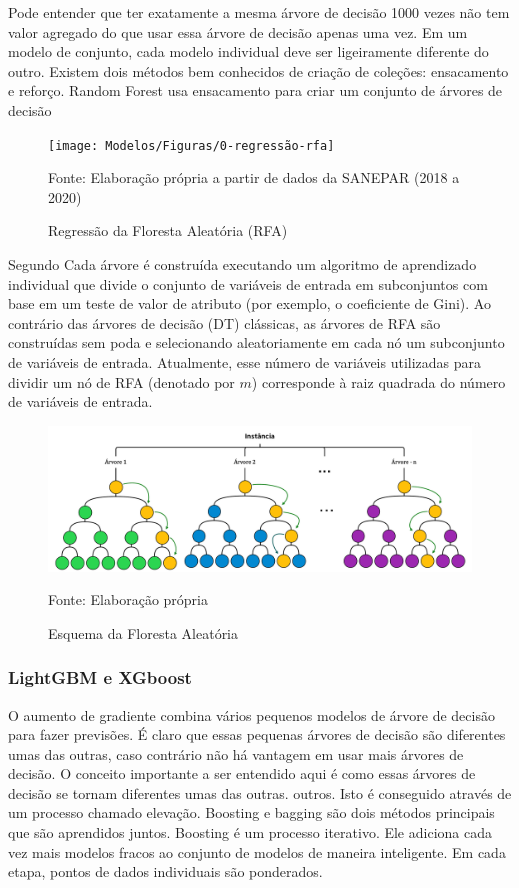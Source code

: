 Pode entender que ter exatamente a mesma árvore de decisão 1000 vezes não tem valor agregado do que usar essa árvore de decisão apenas uma vez.  Em um modelo de conjunto, cada modelo individual deve ser ligeiramente diferente do outro. Existem dois métodos bem conhecidos de criação de coleções: ensacamento e reforço.  Random Forest usa ensacamento para criar um conjunto de árvores de decisão

\begin{figure}[H]
	\centering
	\caption{Regressão da Floresta Aleatória (RFA)}
	\label{fig:1-regressao-rfa}
	\texttt{[image: Modelos/Figuras/0-regressão-rfa]}
	
	Fonte: Elaboração própria a partir de dados da SANEPAR (2018 a 2020)
\end{figure}

Segundo  Cada árvore é construída executando um algoritmo de aprendizado individual que divide o conjunto de variáveis de entrada em subconjuntos com base em um teste de valor de atributo (por exemplo, o coeficiente de Gini). Ao contrário das árvores de decisão (DT) clássicas, as árvores de RFA são construídas sem poda e selecionando aleatoriamente em cada nó um subconjunto de variáveis de entrada. Atualmente, esse número de variáveis utilizadas para dividir um nó de RFA (denotado por $m$) corresponde à raiz quadrada do número de variáveis de entrada.

\begin{figure}[H]
	\centering
	\caption{Esquema da Floresta Aleatória}
	\label{fig:rf}
	\includegraphics[width=1\linewidth]{Modelos/Figuras/RF}
	
	Fonte: Elaboração própria
\end{figure}


\subsubsection{LightGBM e XGboost}\label{subsubsec:lgbxgb}

O aumento de gradiente combina vários pequenos modelos de árvore de decisão para fazer previsões. É claro que essas pequenas árvores de decisão são diferentes umas das outras, caso contrário não há vantagem em usar mais árvores de decisão. O conceito importante a ser entendido aqui é como essas árvores de decisão se tornam diferentes umas das outras. outros. Isto é conseguido através de um processo chamado elevação. Boosting e bagging são dois métodos principais que são aprendidos juntos.  Boosting é um processo iterativo. Ele adiciona cada vez mais modelos fracos ao conjunto de modelos de maneira inteligente. Em cada etapa, pontos de dados individuais são ponderados.  

